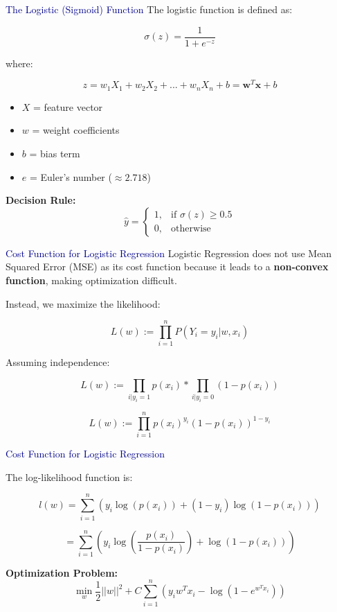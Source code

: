 \begin{frame}{\textcolor{darkblue}{The Logistic (Sigmoid) Function}}
    The logistic function is defined as:

    \[
    \sigma(z) = \frac{1}{1 + e^{-z}}
    \]

    where:

    \[
    z = w_1 X_1 + w_2 X_2 + ... + w_n X_n + b = \mathbf{w}^T \mathbf{x} + b
    \]

    \begin{itemize}
        \item $X$ = feature vector
        \item $w$ = weight coefficients
        \item $b$ = bias term
        \item $e$ = Euler’s number ($\approx 2.718$)
    \end{itemize}

    \textbf{Decision Rule:}
    \[
    \hat{y} =
    \begin{cases} 
    1, & \text{if } \sigma(z) \geq 0.5 \\ 
    0, & \text{otherwise}
    \end{cases}
    \]
\end{frame}

\begin{frame}{\textcolor{darkblue}{Cost Function for Logistic Regression}}
    Logistic Regression does not use Mean Squared Error (MSE) as its cost function because it leads to a \textbf{non-convex function}, making optimization difficult.

    Instead, we maximize the likelihood:

    \[
    L(w) := \prod_{i=1}^{n} P(Y_i = y_i | w, x_i)
    \]

    Assuming independence:

    \[
    L(w) := \prod_{i|y_i=1} p(x_i) * \prod_{i|y_i=0}(1- p(x_i))
    \]

    \[
    L(w) := \prod_{i=1}^{n} p(x_i)^{y_i}(1- p(x_i))^{1-y_i}
    \]
\end{frame}

\begin{frame}{\textcolor{darkblue}{Cost Function for Logistic Regression}}
    
    The log-likelihood function is:

    \[
    l(w) = \sum_{i=1}^{n} \left( y_i \log(p(x_i)) + (1-y_i) \log(1- p(x_i)) \right)
    \]

    \[
    = \sum_{i=1}^{n} \left( y_i \log\left(\frac{p(x_i)}{1-p(x_i)}\right) + \log(1-p(x_i)) \right)
    \]

    \textbf{Optimization Problem:}
    \[
    \min_{w} \frac{1}{2}||w||^2 + C \sum_{i=1}^{n} \left( y_i w^T x_i - \log(1-e^{w^T x_i}) \right)
    \]
\end{frame}

